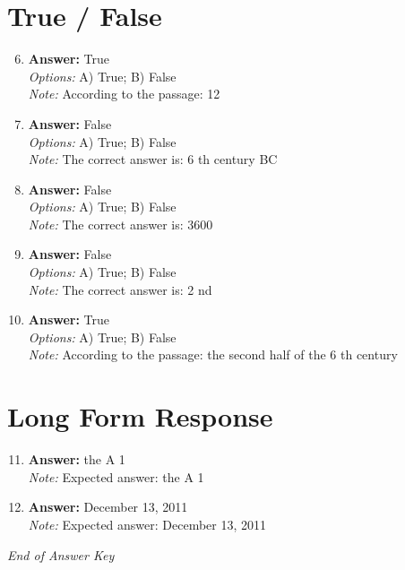 \documentclass[12pt]{article}
\begin{document}
\section*{True / False}
\begin{enumerate}[label=\arabic*.]
\setcounter{enumi}{5}
\item \textbf{Answer:} True
\\ \textit{Options:} A) True; B) False
\\ \textit{Note:} According to the passage: 12
\item \textbf{Answer:} False
\\ \textit{Options:} A) True; B) False
\\ \textit{Note:} The correct answer is: 6 th century BC
\item \textbf{Answer:} False
\\ \textit{Options:} A) True; B) False
\\ \textit{Note:} The correct answer is: 3600
\item \textbf{Answer:} False
\\ \textit{Options:} A) True; B) False
\\ \textit{Note:} The correct answer is: 2 nd
\item \textbf{Answer:} True
\\ \textit{Options:} A) True; B) False
\\ \textit{Note:} According to the passage: the second half of the 6 th century
\end{enumerate}

\section*{Long Form Response}
\begin{enumerate}[label=\arabic*.]
\setcounter{enumi}{10}
\item \textbf{Answer:} the A 1
\\ \textit{Note:} Expected answer: the A 1
\item \textbf{Answer:} December 13, 2011
\\ \textit{Note:} Expected answer: December 13, 2011
\end{enumerate}

\vfill
\noindent\textit{End of Answer Key}
\end{document}
